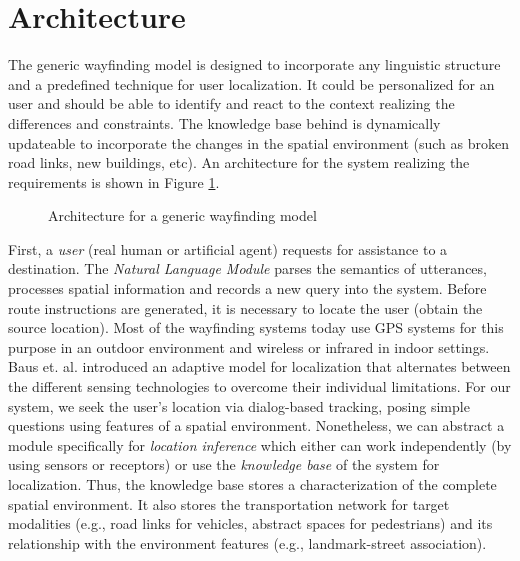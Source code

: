 \documentclass{iitkthesis}
\begin{document}
 \section{Architecture}
The generic wayfinding model is designed to incorporate any linguistic 
structure and a predefined technique for user localization. It could 
be personalized for an user and should be able to identify and react to 
the context realizing the differences and constraints. The knowledge base 
behind is dynamically updateable to incorporate 
the changes in the spatial environment (such as broken road links, new 
buildings, etc). An architecture for the system realizing the requirements is 
shown in Figure \ref{fig:arc}. 
 \begin{figure}
\centering
\caption{Architecture for a generic wayfinding model}
\label{fig:arc}
 \end{figure}
First, a \textit{user} (real human or artificial agent) requests for assistance 
to a destination. The \textit{Natural Language Module} parses the 
semantics of utterances, processes spatial information and records a new 
query into the system. Before route instructions are generated, it 
is necessary to locate the user (obtain the source location). Most of the 
wayfinding systems today use GPS systems for this purpose in an outdoor 
environment and wireless or infrared in indoor settings. Baus et. 
al. \cite{baus} introduced an adaptive model for localization that 
alternates between the different sensing technologies to overcome their 
individual limitations. For our system, we seek 
the user's location via dialog-based tracking, posing simple questions 
using features of a spatial environment. Nonetheless, we can abstract a 
module specifically for \textit{location inference} which either can work 
independently (by using sensors or receptors) or use the 
\textit{knowledge base} of the system for localization. Thus, the 
knowledge base stores a characterization of the complete spatial 
environment. It also stores the transportation network for target modalities 
(e.g., road links for vehicles, abstract spaces for pedestrians) and its 
relationship with the environment features (e.g., landmark-street 
association).
\end{document}
